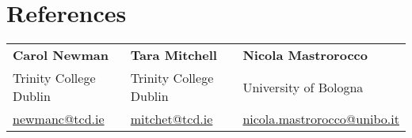 \documentclass{resume}
\begin{document}
\section{References}
\begin{tabular}{l l l}
        {\bf Carol Newman} & {\bf Tara Mitchell} & {\bf Nicola Mastrorocco} \\[.5\smallskipamount]
        Trinity College Dublin &  Trinity College Dublin & University of Bologna \\ 
        {\href{mailto://newmanc@tcd.ie}{newmanc@tcd.ie}} & {\href{mailto://mitchet@tcd.ie}{mitchet@tcd.ie}} & {\href{mailto://nicola.mastrorocco@unibo.it }{nicola.mastrorocco@unibo.it }} \\
\end{tabular}
\end{document}
